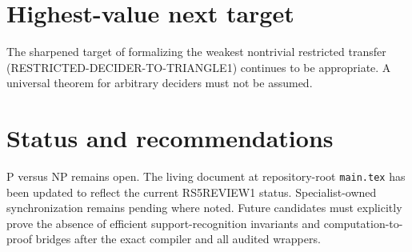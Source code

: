 \documentclass[11pt]{article}
\begin{document}
\section{Highest-value next target}
The sharpened target of formalizing the weakest nontrivial restricted transfer (RESTRICTED-DECIDER-TO-TRIANGLE1) continues to be appropriate. A universal theorem for arbitrary deciders must not be assumed.

\section{Status and recommendations}
P versus NP remains open. The living document at repository-root \texttt{main.tex} has been updated to reflect the current RS5REVIEW1 status. Specialist-owned synchronization remains pending where noted. Future candidates must explicitly prove the absence of efficient support-recognition invariants and computation-to-proof bridges after the exact compiler and all audited wrappers.

\end{document}
